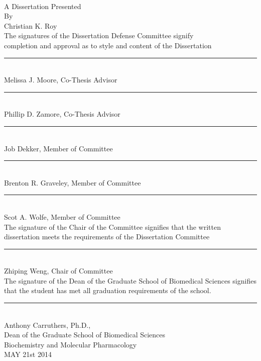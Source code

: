 \begin{titlepage}\label{hd:titlePage}
\begin{center}
		\ttitle \\[0.25cm]

		A Dissertation Presented \\[0.25cm]
		By \\[0.25cm]
		Christian K. Roy \\[0.25cm]
 
		The signatures of the Dissertation Defense Committee signify \\
		completion and approval as to style and content of the Dissertation\\[1cm]
		\rule[1em]{25em}{1pt}\\[-0.6cm]%
		Melissa J. Moore, Co-Thesis Advisor\\[1cm]
		\rule[1em]{25em}{1pt}\\[-0.6cm]
		Phillip D. Zamore, Co-Thesis Advisor\\[1cm]
		\rule[1em]{25em}{1pt}\\[-0.6cm]
		Job Dekker, Member of Committee\\[1cm]
		\rule[1em]{25em}{1pt}\\[-0.6cm]
		Brenton R. Graveley, Member of Committee\\[1cm]
		\rule[1em]{25em}{1pt}\\[-0.6cm]
		Scot A. Wolfe, Member of Committee\\[1cm]
		The signature of the Chair of the Committee signifies that the written
		dissertation meets the requirements of the Dissertation Committee\\[1cm]
		\rule[1em]{25em}{1pt}\\[-0.6cm]
		Zhiping Weng, Chair of Committee\\[0.25cm]
		The signature of the Dean of the Graduate School of Biomedical Sciences signifies that the student has met all graduation requirements of the school.\\[1cm]
		\rule[1em]{25em}{1pt}\\[-0.6cm]
		Anthony Carruthers, Ph.D.,\\[0.25cm]
		Dean of the Graduate School of Biomedical Sciences\\[0.25cm]
		Biochemistry and Molecular Pharmacology\\[0.25cm]
		MAY 21st 2014 

 \end{center}
 \end{titlepage}
\clearpage %
